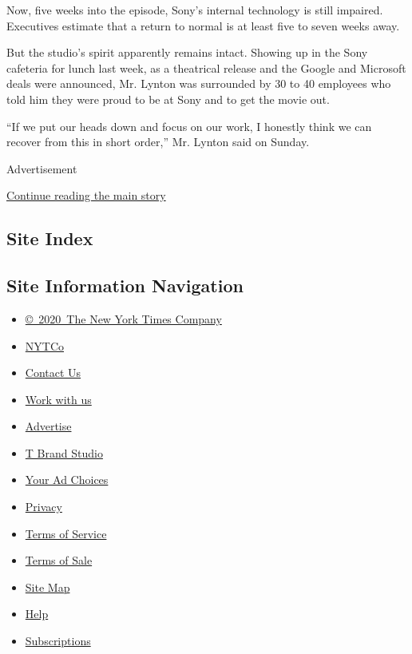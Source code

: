Now, five weeks into the episode, Sony's internal technology is still
impaired. Executives estimate that a return to normal is at least five
to seven weeks away.

But the studio's spirit apparently remains intact. Showing up in the
Sony cafeteria for lunch last week, as a theatrical release and the
Google and Microsoft deals were announced, Mr. Lynton was surrounded by
30 to 40 employees who told him they were proud to be at Sony and to get
the movie out.

``If we put our heads down and focus on our work, I honestly think we
can recover from this in short order,'' Mr. Lynton said on Sunday.

Advertisement

\protect\hyperlink{after-bottom}{Continue reading the main story}

\hypertarget{site-index}{%
\subsection{Site Index}\label{site-index}}

\hypertarget{site-information-navigation}{%
\subsection{Site Information
Navigation}\label{site-information-navigation}}

\begin{itemize}
\tightlist
\item
  \href{https://help.nytimes3xbfgragh.onion/hc/en-us/articles/115014792127-Copyright-notice}{©~2020~The
  New York Times Company}
\end{itemize}

\begin{itemize}
\tightlist
\item
  \href{https://www.nytco.com/}{NYTCo}
\item
  \href{https://help.nytimes3xbfgragh.onion/hc/en-us/articles/115015385887-Contact-Us}{Contact
  Us}
\item
  \href{https://www.nytco.com/careers/}{Work with us}
\item
  \href{https://nytmediakit.com/}{Advertise}
\item
  \href{http://www.tbrandstudio.com/}{T Brand Studio}
\item
  \href{https://www.nytimes3xbfgragh.onion/privacy/cookie-policy\#how-do-i-manage-trackers}{Your
  Ad Choices}
\item
  \href{https://www.nytimes3xbfgragh.onion/privacy}{Privacy}
\item
  \href{https://help.nytimes3xbfgragh.onion/hc/en-us/articles/115014893428-Terms-of-service}{Terms
  of Service}
\item
  \href{https://help.nytimes3xbfgragh.onion/hc/en-us/articles/115014893968-Terms-of-sale}{Terms
  of Sale}
\item
  \href{https://spiderbites.nytimes3xbfgragh.onion}{Site Map}
\item
  \href{https://help.nytimes3xbfgragh.onion/hc/en-us}{Help}
\item
  \href{https://www.nytimes3xbfgragh.onion/subscription?campaignId=37WXW}{Subscriptions}
\end{itemize}
